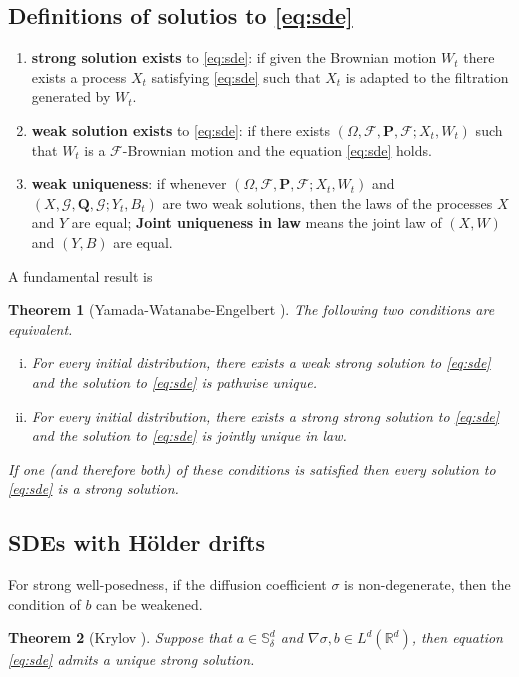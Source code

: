 \documentclass[twoside, 12pt]{book}
\numberwithin{equation}{chapter}
\newtheorem{theorem}{Theorem}[section]
\def\cF{{\mathcal F}}
\def\cG{{\mathcal G}}
\def\mR{{\mathbb R}}
\def\mS{{\mathbb S}}
\def\bP{{\mathbf P}}
\def\bQ{{\mathbf Q}}
\def\sF{{\mathscr F}}
\def\sG{{\mathscr G}}
\begin{document}
	\subsection{Definitions of solutios to \eqref{eq:sde}}
	\begin{enumerate}
		\item {\bf strong solution exists} to \eqref{eq:sde}: if given the Brownian motion $W_t$ there exists a process $X_t$ satisfying \eqref{eq:sde} such that $X_t$ is adapted to the filtration generated by $W_t$.
		\item {\bf weak solution exists} to \eqref{eq:sde}: if there exists $(\Omega, \cF, \bP, \sF; X_t, W_t)$ such that $W_t$ is a $\sF$-Brownian motion and the equation \eqref{eq:sde} holds. 
		\item {\bf weak uniqueness}: if whenever $(\Omega, \cF, \bP, \sF; X_t, W_t)$ and $(X, \cG, \bQ, \sG; Y_t, B_t)$ are two weak solutions, then the laws of the processes $X$ and $Y$ are equal; {\bf Joint uniqueness in law} means the joint law of $(X,W)$ and $(Y,B)$ are equal. 
	\end{enumerate}
	A fundamental result is 
	\begin{theorem}[Yamada-Watanabe-Engelbert \cite{engelbert1991theorem}]\label{thm:YWE}
		The following two conditions are equivalent.
		\begin{enumerate}[(i)]
			\item For every initial distribution, there exists a weak strong solution to \eqref{eq:sde} and the solution to \eqref{eq:sde} is pathwise unique. 
			\item For every initial distribution, there exists a strong strong solution to \eqref{eq:sde} and the solution to \eqref{eq:sde} is jointly unique in law.
		\end{enumerate}
		If one (and therefore both) of these conditions is satisfied then every solution to \eqref{eq:sde} is a strong solution. 
	\end{theorem}
	
	\subsection{SDEs with H\"older drifts}
	
	For strong well-posedness, if the diffusion coefficient $\sigma$ is non-degenerate, then the condition of $b$ can be weakened. 
	\begin{theorem}[Krylov \cite{krylov2021strong}]
		Suppose that $a\in \mS_\delta^d$  and $\nabla \sigma, b\in L^d(\mR^d)$, then equation \eqref{eq:sde} admits a unique strong solution. 
	\end{theorem}
	
\end{document}
